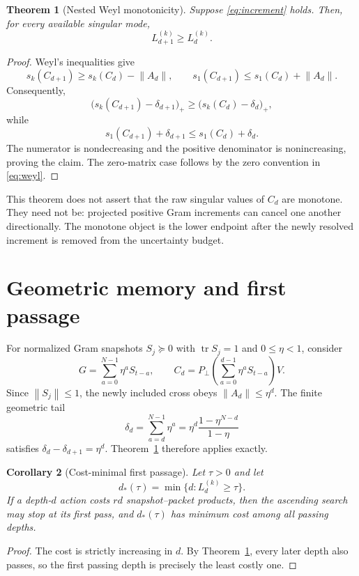 \documentclass[12pt]{article}
\newtheorem{theorem}{Theorem}
\newtheorem{corollary}[theorem]{Corollary}
\newcommand{\norm}[1]{\left\lVert#1\right\rVert}
\begin{document}
\begin{theorem}[Nested Weyl monotonicity]\label{thm:monotone}
Suppose \eqref{eq:increment} holds.  Then, for every available singular mode,
\[
 L_{d+1}^{(k)}\geq L_d^{(k)}.
\]
\end{theorem}
\begin{proof}
Weyl's inequalities give
\[
 s_k(C_{d+1})\geq s_k(C_d)-\norm{A_d},\qquad
 s_1(C_{d+1})\leq s_1(C_d)+\norm{A_d}.
\]
Consequently,
\[
 \bigl(s_k(C_{d+1})-\delta_{d+1}\bigr)_+
 \geq \bigl(s_k(C_d)-\delta_d\bigr)_+,
\]
while
\[
 s_1(C_{d+1})+\delta_{d+1}
 \leq s_1(C_d)+\delta_d.
\]
The numerator is nondecreasing and the positive denominator is
nonincreasing, proving the claim.  The zero-matrix case follows by the
zero convention in \eqref{eq:weyl}.
\end{proof}

This theorem does not assert that the raw singular values of $C_d$ are
monotone.  They need not be: projected positive Gram increments can cancel
one another directionally.  The monotone object is the lower endpoint after
the newly resolved increment is removed from the uncertainty budget.

\section{Geometric memory and first passage}
For normalized Gram snapshots $S_j\succeq0$ with $\operatorname{tr}S_j=1$
and $0\leq\eta<1$, consider
\[
 G=\sum_{a=0}^{N-1}\eta^aS_{t-a},\qquad
 C_d=P_\perp\left(\sum_{a=0}^{d-1}\eta^aS_{t-a}\right)V.
\]
Since $\norm{S_j}\leq1$, the newly included cross obeys
$\norm{A_d}\leq\eta^d$.  The finite geometric tail
\begin{equation}\label{eq:tail}
 \delta_d=\sum_{a=d}^{N-1}\eta^a
 =\eta^d\frac{1-\eta^{N-d}}{1-\eta}
\end{equation}
satisfies $\delta_d-\delta_{d+1}=\eta^d$.  Theorem~\ref{thm:monotone}
therefore applies exactly.

\begin{corollary}[Cost-minimal first passage]\label{cor:first}
Let $\tau>0$ and let
\[
 d_*(\tau)=\min\{d:L_d^{(k)}\geq\tau\}.
\]
If a depth-$d$ action costs $rd$ snapshot--packet products, then the ascending
search may stop at its first pass, and $d_*(\tau)$ has minimum cost among all
passing depths.
\end{corollary}
\begin{proof}
The cost is strictly increasing in $d$.  By Theorem~\ref{thm:monotone}, every
later depth also passes, so the first passing depth is precisely the least
costly one.
\end{proof}
\end{document}
